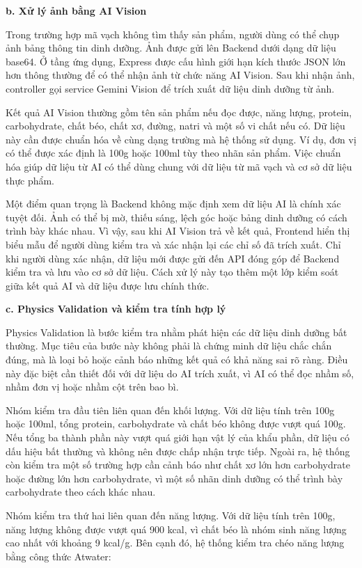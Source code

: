 \documentclass[12pt, a4paper]{report}
\begin{document}
\textbf{b. Xử lý ảnh bằng AI Vision}

Trong trường hợp mã vạch không tìm thấy sản phẩm, người dùng có thể chụp ảnh bảng thông tin dinh dưỡng. Ảnh được gửi lên Backend dưới dạng dữ liệu base64. Ở tầng ứng dụng, Express được cấu hình giới hạn kích thước JSON lớn hơn thông thường để có thể nhận ảnh từ chức năng AI Vision. Sau khi nhận ảnh, controller gọi service Gemini Vision để trích xuất dữ liệu dinh dưỡng từ ảnh.

Kết quả AI Vision thường gồm tên sản phẩm nếu đọc được, năng lượng, protein, carbohydrate, chất béo, chất xơ, đường, natri và một số vi chất nếu có. Dữ liệu này cần được chuẩn hóa về cùng dạng trường mà hệ thống sử dụng. Ví dụ, đơn vị có thể được xác định là 100g hoặc 100ml tùy theo nhãn sản phẩm. Việc chuẩn hóa giúp dữ liệu từ AI có thể dùng chung với dữ liệu từ mã vạch và cơ sở dữ liệu thực phẩm.

Một điểm quan trọng là Backend không mặc định xem dữ liệu AI là chính xác tuyệt đối. Ảnh có thể bị mờ, thiếu sáng, lệch góc hoặc bảng dinh dưỡng có cách trình bày khác nhau. Vì vậy, sau khi AI Vision trả về kết quả, Frontend hiển thị biểu mẫu để người dùng kiểm tra và xác nhận lại các chỉ số đã trích xuất. Chỉ khi người dùng xác nhận, dữ liệu mới được gửi đến API đóng góp để Backend kiểm tra và lưu vào cơ sở dữ liệu. Cách xử lý này tạo thêm một lớp kiểm soát giữa kết quả AI và dữ liệu được lưu chính thức.

\textbf{c. Physics Validation và kiểm tra tính hợp lý}

Physics Validation là bước kiểm tra nhằm phát hiện các dữ liệu dinh dưỡng bất thường. Mục tiêu của bước này không phải là chứng minh dữ liệu chắc chắn đúng, mà là loại bỏ hoặc cảnh báo những kết quả có khả năng sai rõ ràng. Điều này đặc biệt cần thiết đối với dữ liệu do AI trích xuất, vì AI có thể đọc nhầm số, nhầm đơn vị hoặc nhầm cột trên bao bì.

Nhóm kiểm tra đầu tiên liên quan đến khối lượng. Với dữ liệu tính trên 100g hoặc 100ml, tổng protein, carbohydrate và chất béo không được vượt quá 100g. Nếu tổng ba thành phần này vượt quá giới hạn vật lý của khẩu phần, dữ liệu có dấu hiệu bất thường và không nên được chấp nhận trực tiếp. Ngoài ra, hệ thống còn kiểm tra một số trường hợp cần cảnh báo như chất xơ lớn hơn carbohydrate hoặc đường lớn hơn carbohydrate, vì một số nhãn dinh dưỡng có thể trình bày carbohydrate theo cách khác nhau.

Nhóm kiểm tra thứ hai liên quan đến năng lượng. Với dữ liệu tính trên 100g, năng lượng không được vượt quá 900 kcal, vì chất béo là nhóm sinh năng lượng cao nhất với khoảng 9 kcal/g. Bên cạnh đó, hệ thống kiểm tra chéo năng lượng bằng công thức Atwater:
\end{document}
